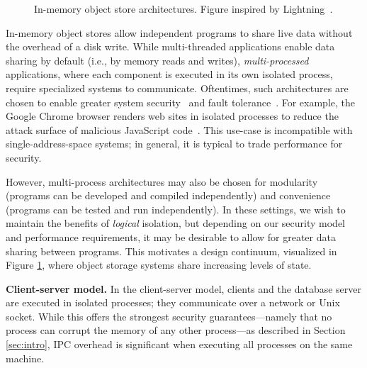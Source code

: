 \begin{figure}[t]
\begin{center}
	\end{center}
    \caption{\label{fig:obj-store-arch} In-memory object store architectures.
    Figure inspired by Lightning~\cite{lightning22}.}
\end{figure}

In-memory object stores allow independent programs to share live data without
the overhead of a disk write. While multi-threaded applications enable data
sharing by default (i.e., by memory reads and writes), \emph{multi-processed}
applications, where each component is executed in its own isolated process,
require specialized systems to communicate. Oftentimes, such architectures are
chosen to enable greater system security~\cite{reis19siteisolation} and fault
tolerance~\cite{wang19lineage}. For example, the Google Chrome browser renders
web sites in isolated processes to reduce the attack surface of malicious
JavaScript code~\cite{reis19siteisolation}. This use-case is incompatible with
single-address-space systems; in general, it is typical to trade performance for
security.

However, multi-process architectures may also be chosen for modularity (programs
can be developed and compiled independently) and convenience (programs can be
tested and run independently). In these settings, we wish to maintain the
benefits of \emph{logical} isolation, but depending on our security model and
performance requirements, it may be desirable to allow for greater data sharing
between programs. This motivates a design continuum, visualized in Figure
\ref{fig:obj-store-arch}, where object storage systems share increasing levels
of state.

\textbf{Client-server model.} In the client-server model, clients and the
database server are executed in isolated processes; they communicate over a
network or Unix socket. While this offers the strongest security
guarantees---namely that no process can corrupt the memory of any other
process---as described in Section \ref{sec:intro}, IPC overhead is significant
when executing all processes on the same machine.

